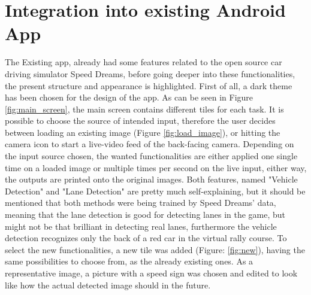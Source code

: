 
\chapter{Integration into existing Android App}\label{chapter:Integration into existing App}

The Existing app, already had some features related to the open source car driving simulator Speed Dreams, before going deeper into these functionalities, the present structure and appearance is highlighted.
First of all, a dark theme has been chosen for the design of the app. As can be seen in Figure \ref{fig:main_screen}, the main screen contains different tiles for each task. It is possible to choose the source of intended input, therefore the user decides between loading an existing image (Figure \ref{fig:load_image}), or hitting the camera icon to start a live-video feed of the back-facing camera. Depending on the input source chosen, the wanted functionalities are either applied one single time on a loaded image or multiple times per second on the live input, either way, the outputs are printed onto the original images. Both features, named "Vehicle Detection" and "Lane Detection" are pretty much self-explaining, but it should be mentioned that both methods were being trained by Speed Dreams' data, meaning that the lane detection is good for detecting lanes in the game, but might not be that brilliant in detecting real lanes, furthermore the vehicle detection recognizes only the back of a red car in the virtual rally course.\newline
To select the new functionalities, a new tile was added (Figure: \ref{fig:new}), having the same possibilities to choose from, as the already existing ones. As a representative image, a picture with a speed sign was chosen and edited to look like how the actual detected image should in the future. 
